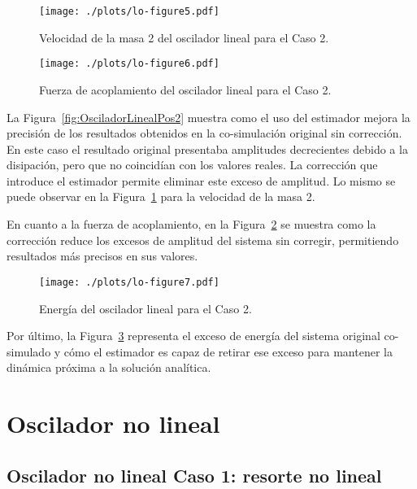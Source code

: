 \begin{figure}[ht!]\centering
	\texttt{[image: ./plots/lo-figure5.pdf]}
	\caption{Velocidad de la masa 2 del oscilador lineal para el Caso 2.}
	\label{fig:OsciladorLinealVel2}
\end{figure}

\begin{figure}[ht!]\centering
	\texttt{[image: ./plots/lo-figure6.pdf]}
	\caption{Fuerza de acoplamiento del oscilador lineal para el Caso 2.}
	\label{fig:OsciladorLinealFor2}
\end{figure}

La Figura~\ref{fig:OsciladorLinealPos2} muestra como el uso del estimador mejora la precisión de los resultados obtenidos en la co-simulación original sin corrección.
En este caso el resultado original presentaba amplitudes decrecientes debido a la disipación, pero que no coincidían con los valores reales.
La corrección que introduce el estimador permite eliminar este exceso de amplitud.
Lo mismo se puede observar en la Figura~\ref{fig:OsciladorLinealVel2} para la velocidad de la masa 2.

En cuanto a la fuerza de acoplamiento, en la Figura~\ref{fig:OsciladorLinealFor2} se muestra como la corrección reduce los excesos de amplitud del sistema sin corregir, permitiendo resultados más precisos en sus valores.

\begin{figure}[ht!]\centering
	\texttt{[image: ./plots/lo-figure7.pdf]}
	\caption{Energía del oscilador lineal para el Caso 2.}
	\label{fig:OsciladorLinealEnergia2}
\end{figure}

Por último, la Figura~\ref{fig:OsciladorLinealEnergia2} representa el exceso de energía del sistema original co-simulado y cómo el estimador es capaz de retirar ese exceso para mantener la dinámica próxima a la solución analítica.



\section{Oscilador no lineal}
\label{sec:res_osciladorNL}

\subsection{Oscilador no lineal Caso 1: resorte no lineal}
\label{subsec:res_osciladorNL1}

